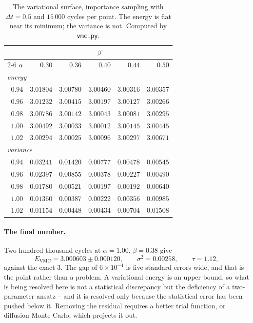 \begin{table}[h]
\centering
\renewcommand{\arraystretch}{1.2}
\setlength{\tabcolsep}{8pt}
\small
\begin{tabular}{rrrrrr}
\toprule
& \multicolumn{5}{c}{$\beta$}\\
\cmidrule(l){2-6}
$\alpha$ & $0.30$ & $0.36$ & $0.40$ & $0.44$ & $0.50$\\
\midrule
\multicolumn{6}{l}{\emph{energy}}\\
$0.94$ & $3.01804$ & $3.00780$ & $3.00460$ & $3.00316$ & $3.00357$\\
$0.96$ & $3.01232$ & $3.00415$ & $3.00197$ & $3.00127$ & $3.00266$\\
$0.98$ & $3.00786$ & $3.00142$ & $3.00043$ & $3.00081$ & $3.00295$\\
$1.00$ & $3.00492$ & $3.00033$ & $3.00012$ & $3.00145$ & $3.00445$\\
$1.02$ & $3.00294$ & $3.00025$ & $3.00096$ & $3.00297$ & $3.00671$\\
\midrule
\multicolumn{6}{l}{\emph{variance}}\\
$0.94$ & $0.03241$ & $0.01420$ & $0.00777$ & $0.00478$ & $0.00545$\\
$0.96$ & $0.02397$ & $0.00855$ & $0.00378$ & $0.00227$ & $0.00490$\\
$0.98$ & $0.01780$ & $0.00521$ & $0.00197$ & $0.00192$ & $0.00640$\\
$1.00$ & $0.01360$ & $0.00387$ & $0.00222$ & $0.00356$ & $0.00985$\\
$1.02$ & $0.01154$ & $0.00448$ & $0.00434$ & $0.00704$ & $0.01508$\\
\bottomrule
\end{tabular}
\caption{The variational surface, importance sampling with $\Delta t=0.5$ and
$15\,000$ cycles per point.  The energy is flat near its minimum; the variance
is not.  Computed by \texttt{vmc.py}.}
\label{tab:13-surface}
\end{table}

\paragraph{The final number.}
Two hundred thousand cycles at $\alpha=1.00$, $\beta=0.38$ give
\begin{equation}
  E_{\mathrm{VMC}} = 3.000603 \pm 0.000120,
  \qquad \sigma^2 = 0.00258,
  \qquad \tau = 1.12 ,
  \label{eq:13-final}
\end{equation}
against the exact $3$.  The gap of $6\times10^{-4}$ is five standard errors
wide, and that is the point rather than a problem.  A variational energy is an
upper bound, so what is being resolved here is not a statistical discrepancy
but the deficiency of a two-parameter ansatz -- and it is resolved only
because the statistical error has been pushed below it.  Removing the residual
requires a better trial function, or diffusion Monte Carlo, which projects it
out.


